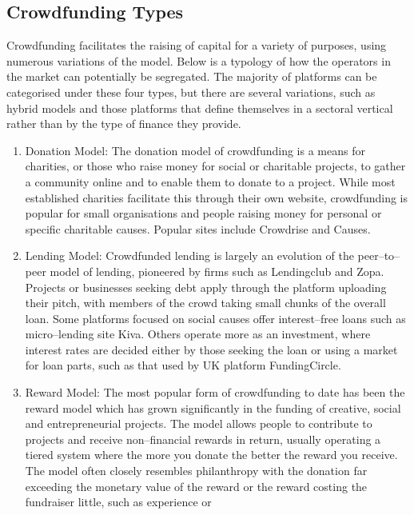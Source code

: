 \subsection*{ Crowdfunding Types }
Crowdfunding facilitates the raising of capital for a variety of purposes, using numerous
variations of the model. Below is a typology of how the operators in the market can potentially
be segregated. The majority of platforms can be categorised under these four types, but there
are several variations, such as hybrid models and those platforms that define themselves in a
sectoral vertical rather than by the type of finance they provide.
\begin{enumerate}
    \item Donation Model:
          The donation model of crowdfunding is a means for charities, or those who
          raise money for social or charitable projects, to gather a community online and to enable
          them to donate to a project. While most established charities facilitate this through their
          own website, crowdfunding is popular for small organisations and people raising money for
          personal or specific charitable causes. Popular sites include Crowdrise and Causes.
    \item Lending Model:
          Crowdfunded lending is largely an evolution of the peer–to–peer model of
          lending, pioneered by firms such as Lendingclub and Zopa. Projects or businesses seeking
          debt apply through the platform uploading their pitch, with members of the crowd taking
          small chunks of the overall loan. Some platforms focused on social causes offer interest–free
          loans such as micro–lending site Kiva. Others operate more as an investment, where interest
          rates are decided either by those seeking the loan or using a market for loan parts, such as that
          used by UK platform FundingCircle.
    \item Reward Model:
          The most popular form of crowdfunding to date has been the reward model
          which has grown significantly in the funding of creative, social and entrepreneurial projects.
          The model allows people to contribute to projects and receive non–financial rewards in return,
          usually operating a tiered system where the more you donate the better the reward you
          receive. The model often closely resembles philanthropy with the donation far exceeding the
          monetary value of the reward or the reward costing the fundraiser little, such as experience or

\end{enumerate}
